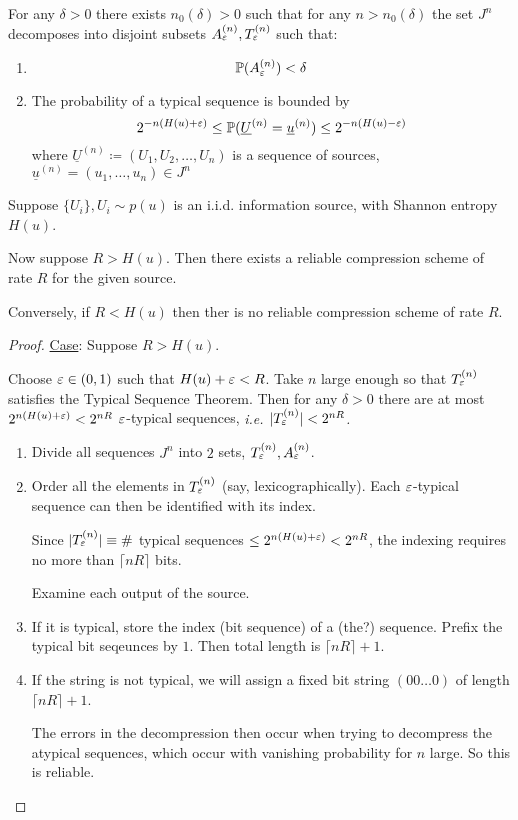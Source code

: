 \documentclass[]{article}
\begin{document}
\begin{cor}
    For any $\delta > 0$ there exists $n_0(\delta) > 0$ such that for any $n > n_0(\delta)$ the set $J^n$ decomposes into disjoint subsets $A_\varepsilon^{(n)}, T_\varepsilon^{(n)}$ such that:
    \begin{enumerate}
        \item $$\mathbb{P}(A_\varepsilon^{(n)}) < \delta$$
        \item The probability of a typical sequence is bounded by $$2^{-n(H(u)+\varepsilon)} \le \mathbb{P}(\underline{U}^{(n)} = \underline{u}^{(n)})\le 2^{-n(H(u) - \varepsilon)}$$
        where $\underline{U}^{(n)}\coloneqq (U_1,U_2,\dots,U_n)$ is a sequence of sources, $\underline{u}^{(n)} = (u_1,\dots,u_n)\in J^n$
    \end{enumerate}
\end{cor}


\begin{theorem}
    Suppose $\{U_i\}, U_i\sim p(u)$ is an i.i.d. information source, with Shannon entropy $H(u)$.

    Now suppose $R > H(u)$. Then there exists a reliable compression scheme of rate $R$ for the given source.

    Conversely, if $R < H(u)$ then ther is no reliable compression scheme of rate $R$.
\end{theorem}
\begin{proof}
    \underline{Case}: Suppose $R > H(u)$.

    Choose $\varepsilon\in (0,1)$ such that $H(u) + \varepsilon < R$. Take $n$ large enough so that $T_\varepsilon^{(n)}$ satisfies the Typical Sequence Theorem. Then for any $\delta > 0$ there are at most $2^{n(H(u)+\varepsilon)} < 2^{nR}$ $\varepsilon$-typical sequences, \it{i.e.} $|T_\varepsilon^{(n)}| < 2^{nR}$.
    \begin{enumerate}[label = \arabic*)]
        \item Divide all sequences $J^n$ into $2$ sets, $T_\varepsilon^{(n)}, A_\varepsilon^{(n)}$.
        \item Order all the elements in $T_\varepsilon^{(n)}$ (say, lexicographically). Each $\varepsilon$-typical sequence can then be identified with its index.
        
        Since $|T_\varepsilon^{(n)}| \equiv \#$ typical sequences $\le 2^{n(H(u)+\varepsilon)} < 2^{nR}$, the indexing requires no more than $\lceil nR \rceil$ bits.

        Examine each output of the source. 

        \item If it is typical, store the index (bit sequence) of a (the?) sequence. Prefix the typical bit seqeunces by $1$. Then total length is $\lceil nR \rceil + 1$.
        
        \item If the string is not typical, we will assign a fixed bit string $(00\dots 0)$ of length $\lceil nR \rceil + 1$.
        
        The errors in the decompression then occur when trying to decompress the atypical sequences, which occur with vanishing probability for $n$ large. So this is reliable.

    \end{enumerate}
\end{proof}
\end{document}
